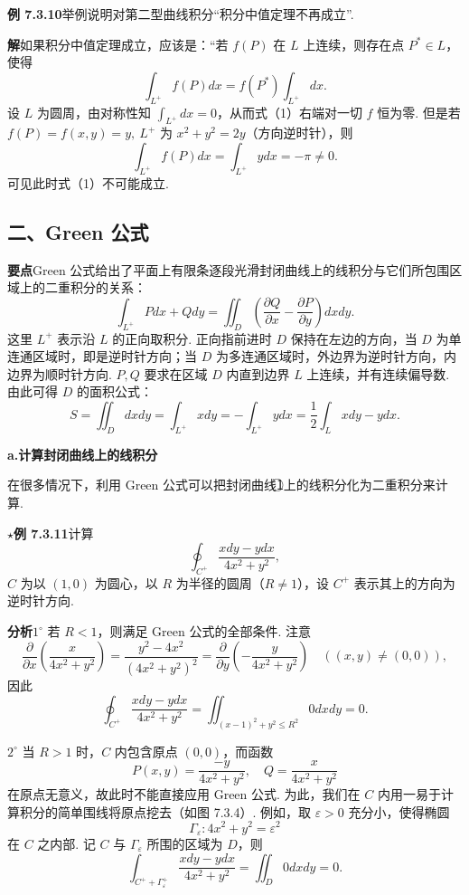 \documentclass[UTF8, 12pt, fontset=fandol, oneside]{ctexart}
\begin{document}
\noindent\textbf{例 7.3.10}\quad 举例说明对第二型曲线积分“积分中值定理不再成立”.

\noindent\textbf{解}\quad 如果积分中值定理成立，应该是：“若 $f(P)$ 在 $L$ 上连续，则存在点 $P^*\in L$，使得
\[
\int_{L^+}f(P)dx=f(P^*)\int_{L^+}dx. \tag{1}
\]
设 $L$ 为圆周，由对称性知 $\displaystyle\int_{L^+}dx=0$，从而式（1）右端对一切 $f$ 恒为零. 但是若 $f(P)=f(x,y)=y,\ L^+$ 为 $x^2+y^2=2y$（方向逆时针），则
\[
\int_{L^+}f(P)dx=\int_{L^+}ydx=-\pi\ne0.
\]
可见此时式（1）不可能成立.

\subsection*{二、Green 公式}

\noindent\textbf{要点}\quad Green 公式给出了平面上有限条逐段光滑封闭曲线上的线积分与它们所包围区域上的二重积分的关系：
\[
\int_{L^+}Pdx+Qdy=\iint_D\left(\frac{\partial Q}{\partial x}-\frac{\partial P}{\partial y}\right)dxdy. \tag{A}
\]
这里 $L^+$ 表示沿 $L$ 的正向取积分. 正向指前进时 $D$ 保持在左边的方向，当 $D$ 为单连通区域时，即是逆时针方向；当 $D$ 为多连通区域时，外边界为逆时针方向，内边界为顺时针方向. $P,Q$ 要求在区域 $D$ 内直到边界 $L$ 上连续，并有连续偏导数. 由此可得 $D$ 的面积公式：
\[
S=\iint_Ddxdy=\int_{L^+}xdy=-\int_{L^+}ydx
=\frac12\int_Lxdy-ydx. \tag{B}
\]

\noindent\textbf{a.\quad 计算封闭曲线上的线积分}

在很多情况下，利用 Green 公式可以把封闭曲线\textcircled{1}上的线积分化为二重积分来计算.

\noindent\textbf{$\star$例 7.3.11}\quad 计算
\[
\oint_{C^+}\frac{xdy-ydx}{4x^2+y^2},
\]
$C$ 为以 $(1,0)$ 为圆心，以 $R$ 为半径的圆周（$R\ne1$），设 $C^+$ 表示其上的方向为逆时针方向.

\noindent\textbf{分析}\quad $1^\circ$ 若 $R<1$，则满足 Green 公式的全部条件. 注意
\[
\frac{\partial}{\partial x}\left(\frac{x}{4x^2+y^2}\right)
=\frac{y^2-4x^2}{(4x^2+y^2)^2}
=\frac{\partial}{\partial y}\left(-\frac{y}{4x^2+y^2}\right)\quad((x,y)\ne(0,0)), \tag{1}
\]
因此
\[
\oint_{C^+}\frac{xdy-ydx}{4x^2+y^2}
=\iint_{(x-1)^2+y^2\le R^2}0dxdy=0.
\]

$2^\circ$ 当 $R>1$ 时，$C$ 内包含原点 $(0,0)$，而函数
\[
P(x,y)=\frac{-y}{4x^2+y^2},\quad Q=\frac{x}{4x^2+y^2}
\]
在原点无意义，故此时不能直接应用 Green 公式. 为此，我们在 $C$ 内用一易于计算积分的简单围线将原点挖去（如图 7.3.4）. 例如，取 $\varepsilon>0$ 充分小，使得椭圆
\[
\Gamma_\varepsilon:4x^2+y^2=\varepsilon^2 \tag{2}
\]
在 $C$ 之内部. 记 $C$ 与 $\Gamma_\varepsilon$ 所围的区域为 $D$，则
\[
\int_{C^++\Gamma_\varepsilon^+}\frac{xdy-ydx}{4x^2+y^2}
=\iint_D0dxdy=0.
\]
\end{document}
